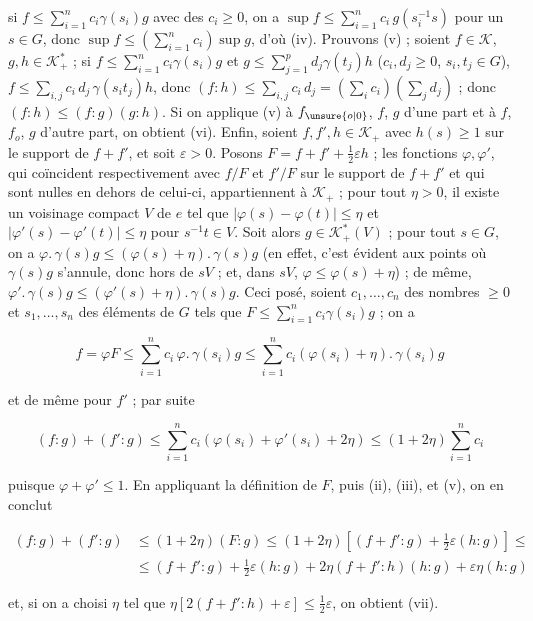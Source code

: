 si $f\leq\sum\limits_{i=1}^n c_i\gamma(s_i)g$ avec des $c_i\geq0$, on a $\sup f\leq\sum\limits_{i=1}^n c_i\,g(s_i^{-1}s)$ pour un $s\in G$, donc $\sup f\leq(\sum\limits_{i=1}^n c_i)\sup g$, d'où (iv). Prouvons (v) ; soient $f\in\mathcal{K}$, $g,h\in\mathcal{K}_+^*$ ; si $f\leq\sum\limits_{i=1}^n c_i\gamma(s_i)g$ et $g\leq\sum\limits_{j=1}^p d_j\gamma(t_j)h$ ($c_i,d_j\geq0$, $s_i,t_j\in G$), $f\leq\sum\limits_{i,j}c_i\,d_j\,\gamma(s_it_j)h$, donc $(f:h)\leq\sum\limits_{i,j}c_i\,d_j=(\sum\limits_i c_i)(\sum\limits_j d_j)$ ; donc $(f:h)\leq(f:g)(g:h)$. Si on applique (v) à $f_{\unsure{o|0}}$, $f$, $g$ d'une part et à $f$, $f_o$, $g$ d'autre part, on obtient (vi). Enfin, soient $f,f',h\in\mathcal{K}_+$ avec $h(s)\geq1$ sur le support de $f+f'$, et soit $\varepsilon>0$. Posons $F=f+f'+\frac{1}{2}\varepsilon h$ ; les fonctions $\varphi,\varphi'$, qui coïncident respectivement avec $f/F$ et $f'/F$ sur le support de $f+f'$ et qui sont nulles en dehors de celui-ci, appartiennent à $\mathcal{K}_+$ ; pour tout $\eta>0$, il existe un voisinage compact $V$ de $e$ tel que $|\varphi(s)-\varphi(t)|\leq\eta$ et $|\varphi'(s)-\varphi'(t)|\leq\eta$ pour $s^{-1}t\in V$. Soit alors $g\in\mathcal{K}_+^*(V)$ ; pour tout $s\in G$, on a $\varphi.\,\gamma(s)g\leq(\varphi(s)+\eta).\,\gamma(s)g$ (en effet, c'est évident aux points où $\gamma(s)g$ s'annule, donc hors de $sV$ ; et, dans $sV$, $\varphi\leq\varphi(s)+\eta$) ; de même, $\varphi'.\,\gamma(s)g\leq(\varphi'(s)+\eta).\,\gamma(s)g$. Ceci posé, soient $c_1,\ldots,c_n$ des nombres $\geq0$ et $s_1,\ldots,s_n$ des éléments de $G$ tels que $F\leq\sum\limits_{i=1}^n c_i\gamma(s_i)g$ ; on a

\[
f=\varphi F\leq\sum_{i=1}^n c_i\,\varphi.\,\gamma(s_i)g\leq\sum_{i=1}^n c_i(\varphi(s_i)+\eta).\,\gamma(s_i)g
\]

et de même pour $f'$ ; par suite

\[
(f:g)+(f':g)\leq\sum_{i=1}^n c_i(\varphi(s_i)+\varphi'(s_i)+2\eta)\leq(1+2\eta)\sum_{i=1}^n c_i
\]

puisque $\varphi+\varphi'\leq1$. En appliquant la définition de $F$, puis (ii), (iii), et (v), on en conclut

\[
\begin{aligned}
(f:g)+(f':g)&\leq(1+2\eta)(F:g)\leq(1+2\eta)\left[(f+f':g)+\frac{1}{2}\varepsilon(h:g)\right]\leq{}\\
&\leq(f+f':g)+\frac{1}{2}\varepsilon(h:g)+2\eta(f+f':h)(h:g)+\varepsilon\eta(h:g)
\end{aligned}
\]

et, si on a choisi $\eta$ tel que $\eta\left[2(f+f':h)+\varepsilon\right]\leq\frac{1}{2}\varepsilon$, on obtient (vii).

